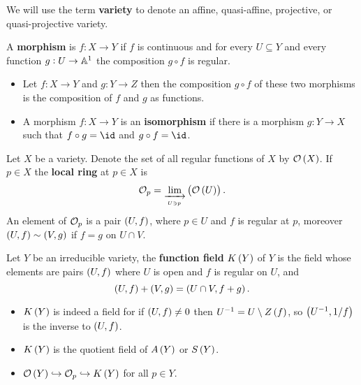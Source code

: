 \begin{definition}
We will use the term \textbf{variety} to denote an affine, quasi-affine, projective, or quasi-projective variety.
\end{definition}

\begin{definition}
A \textbf{morphism} is $ f : X \to Y $ if $ f $ is continuous and for every $ U \subseteq Y $ and every function $ g : U \to \AA^1 $ the composition $ g \circ f $ is regular.
\end{definition}

\begin{remark}
\hfill
\begin{itemize}
\item Let $ f : X \to Y $ and $ g : Y \to Z $ then the composition $ g \circ f $ of these two morphisms is the composition of $ f $ and $ g $ as functions.
\item A morphism $ f : X \to Y $ is an \textbf{isomorphism} if there is a morphism $ g : Y \to X $ such that $ f \circ g = \id $ and $ g \circ f = \id $.
\end{itemize}
\end{remark}

\begin{definition}
Let $ X $ be a variety. Denote the set of all regular functions of $ X $ by $ \OOO\br{X} $. If $ p \in X $ the \textbf{local ring} at $ p \in X $ is
$$ \OOO_p = \lim_{\xrightarrow[U \ni p]{}}\br{\OOO\br{U}}. $$
An element of $ \OOO_p $ is a pair $ \br{U, f} $, where $ p \in U $ and $ f $ is regular at $ p $, moreover $ \br{U, f} \sim \br{V, g} $ if $ f = g $ on $ U \cap V $.
\end{definition}

\pagebreak


\begin{definition}
Let $ Y $ be an irreducible variety, the \textbf{function field} $ K\br{Y} $ of $ Y $ is the field whose elements are pairs $ \br{U, f} $ where $ U $ is open and $ f $ is regular on $ U $, and
$$ \br{U, f} + \br{V, g} = \br{U \cap V, f + g}. $$
\end{definition}

\begin{remark}
\hfill
\begin{itemize}
\item $ K\br{Y} $ is indeed a field for if $ \br{U, f} \ne 0 $ then $ U^{-1} = U \setminus Z\br{f} $, so $ \br{U^{-1}, 1 / f} $ is the inverse to $ \br{U, f} $.
\item $ K\br{Y} $ is the quotient field of $ A\br{Y} $ or $ S\br{Y} $.
\item $ \OOO\br{Y} \hookrightarrow \OOO_p \hookrightarrow K\br{Y} $ for all $ p \in Y $.
\end{itemize}
\end{remark}

